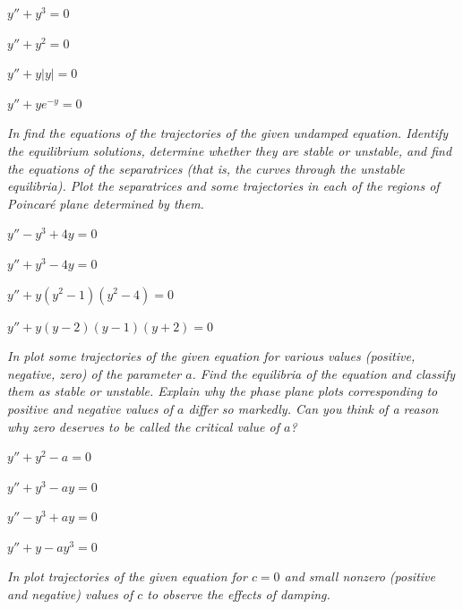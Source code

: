 \begin{exerciselistTwoColumn}
\item\label{exer:4.4.1}\CGex $y''+y^3=0$
\item\label{exer:4.4.2}\CGex $y''+y^2=0$
\item\label{exer:4.4.3}\CGex$ y''+y|y|=0$ 
\item\label{exer:4.4.4}\CGex $y''+ye^{-y}=0$
\end{exerciselistTwoColumn}
%
\textsl{In  find the equations of the
trajectories of the given undamped equation. Identify the equilibrium
solutions,
determine whether they are stable or unstable, and find the equations
of the separatrices (that is, the curves through the unstable
equilibria). Plot the separatrices and some
trajectories in each of the regions of Poincaré plane determined by
them. }

\begin{exerciselistTwoColumn}
\item\label{exer:4.4.5}\CGex $y''-y^3+4y=0$ 
\item\label{exer:4.4.6}\CGex $y''+y^3-4y=0$
\item\label{exer:4.4.7}\CGex $y''+y(y^2-1)(y^2-4)=0$
\item\label{exer:4.4.8}\CGex $y''+y(y-2)(y-1)(y+2)=0$
\end{exerciselistTwoColumn}
%
\textsl{In 
plot some trajectories of the given equation for various values
(positive, negative, zero) of the parameter $a$. Find the equilibria
of the equation and classify them as stable or unstable. Explain why
the phase plane plots corresponding to positive and negative values of
$a$ differ so markedly. Can you think of a reason why zero deserves to
be called the \emph{\color{blue}critical value} of $a$?}

\begin{exerciselistTwoColumn}
\item\label{exer:4.4.9}\Lex $y''+y^2-a=0$
\item\label{exer:4.4.10}\Lex $y''+y^3-ay=0$
\item\label{exer:4.4.11}\Lex $y''-y^3+ay=0$
\item\label{exer:4.4.12}\Lex $y''+y-ay^3=0$
\end{exerciselistTwoColumn}
%
\textsl{In 
plot trajectories of the given equation for $c=0$ and small nonzero
(positive and negative) values of $c$ to observe the effects of
damping.}

